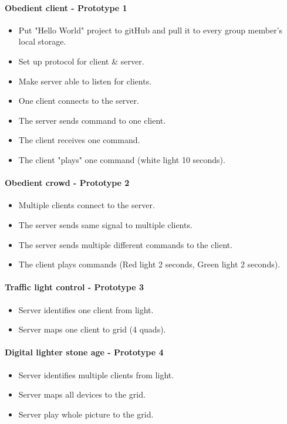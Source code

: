 \paragraph{Obedient client  - Prototype 1}
\begin{itemize}
	\item Put "Hello World" project to gitHub and pull it to every group member's local storage.
	\item Set up protocol for client \& server.
	\item Make server able to listen for clients.
	\item One client connects to the server.
	\item The server sends command to one client.
	\item The client receives one command.
	\item The client "plays" one command (white light 10 seconds).
\end{itemize}

\paragraph{Obedient crowd - Prototype 2}
\begin{itemize}
	\item Multiple clients connect to the server.
	\item The server sends same signal to multiple clients.
	\item The server sends multiple different commands to the client.
	\item The client plays commands (Red light 2 seconds, Green light 2 seconds).
\end{itemize}

\paragraph{Traffic light control - Prototype 3}
\begin{itemize}
	\item Server identifies one client from light.
	\item Server maps one client to grid (4 quads).
\end{itemize}

\paragraph{Digital lighter stone age - Prototype 4}
\begin{itemize}
	\item Server identifies multiple clients from light.
	\item Server maps all devices to the grid.
	\item Server play whole picture to the grid.
\end{itemize}


